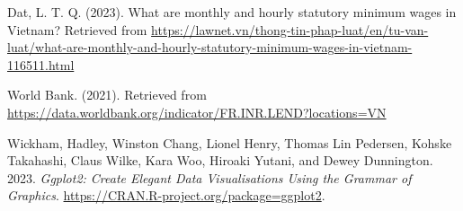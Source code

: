 \documentclass[
]{article}
\newlength{\cslhangindent}
\newlength{\cslentryspacingunit} %
\newenvironment{CSLReferences}[2] %
 {%
  \setlength{\parindent}{0pt}
  \ifodd #1
  \let\oldpar\par
  \def\par{\hangindent=\cslhangindent\oldpar}
  \fi
  \setlength{\parskip}{#2\cslentryspacingunit}
 }%
 {}
\begin{document}
Dat, L. T. Q. (2023). What are monthly and hourly statutory minimum
wages in Vietnam? Retrieved from
\url{https://lawnet.vn/thong-tin-phap-luat/en/tu-van-luat/what-are-monthly-and-hourly-statutory-minimum-wages-in-vietnam-116511.html}

World Bank. (2021). Retrieved from
\url{https://data.worldbank.org/indicator/FR.INR.LEND?locations=VN}

\hypertarget{refs}{}
\begin{CSLReferences}{1}{0}
\leavevmode{}%
Wickham, Hadley, Winston Chang, Lionel Henry, Thomas Lin Pedersen,
Kohske Takahashi, Claus Wilke, Kara Woo, Hiroaki Yutani, and Dewey
Dunnington. 2023. \emph{Ggplot2: Create Elegant Data Visualisations
Using the Grammar of Graphics}.
\url{https://CRAN.R-project.org/package=ggplot2}.

\end{CSLReferences}
\end{document}

